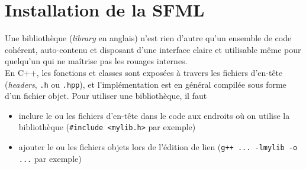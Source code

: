 \documentclass{book}
\def\filename{\texttt}
\begin{document}
\section{Installation de la SFML}

Une bibliothèque (\emph{library} en anglais) n'est rien d'autre qu'un ensemble de code cohérent, auto-contenu et disposant d'une interface claire et utilisable même pour quelqu'un qui ne maîtrise pas les rouages internes.\\

En C++, les fonctions et classes sont exposées à travers les fichiers d'en-tête (\emph{headers}, \filename{.h} ou \filename{.hpp}), et l'implémentation est en général compilée sous forme d'un fichier objet. Pour utiliser une bibliothèque, il faut
\begin{itemize}
  \item inclure le ou les fichiers d'en-tête dans le code aux endroits où on utilise la bibliothèque (\texttt{\#include <mylib.h>} par exemple)
  \item ajouter le ou les fichiers objets lors de l'édition de lien (\texttt{g++ ... -lmylib -o ...} par exemple)
\end{itemize}
\end{document}
